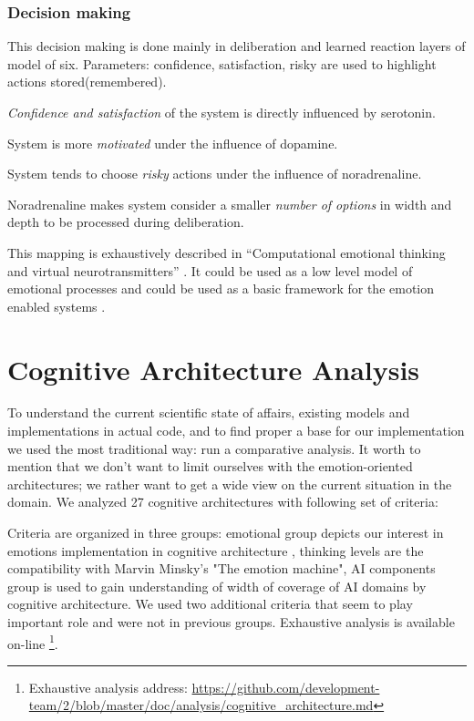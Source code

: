 \subsubsection{Decision making}

This decision making is done mainly in deliberation and learned reaction layers of model of six.
Parameters: confidence, satisfaction, risky are used to highlight actions stored(remembered).

\emph{Confidence and satisfaction} of the system is directly influenced by serotonin.

System is more \emph{motivated} under the influence of dopamine.

System tends to choose \emph{risky} actions under the influence of noradrenaline.

Noradrenaline makes system consider a smaller \emph{number of options} in width and depth to be processed during deliberation.

This mapping is exhaustively described in ``Computational emotional thinking and virtual neurotransmitters'' \cite{computational_emotional_thinking}. It could be used as a low level model of emotional processes and could be used as a basic framework for the emotion enabled systems \cite{whatdoesitmeanforcomputer}.

\section{Cognitive Architecture Analysis}

To understand the current scientific state of affairs, existing models and implementations in actual code, and to find proper a base for our implementation we used the most traditional way: run a comparative analysis. It worth to mention that we don't want to limit ourselves with the emotion-oriented architectures; we rather want to get a wide view on the current situation in the domain. We analyzed 27 cognitive architectures with following set of criteria:

Criteria are organized in three groups: emotional group depicts our interest in emotions implementation in cognitive architecture \cite{computationalmodelsemotionscognition}, thinking levels are the compatibility with Marvin Minsky's "The emotion machine", AI components group is used to gain understanding of width of coverage of AI domains by cognitive architecture. We used two additional criteria that seem to play important role and were not in previous groups. Exhaustive analysis is available on-line \footnote{Exhaustive analysis address: \url{https://github.com/development-team/2/blob/master/doc/analysis/cognitive_architecture.md}}.


